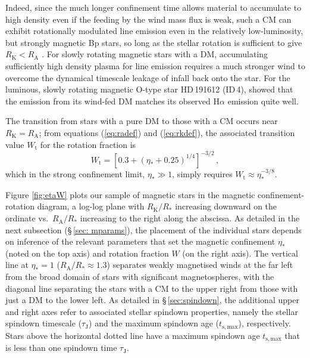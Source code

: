 \documentclass[useAMS,usenatbib]{mn2e}
\newcommand{\etas}{\eta_\ast}
\newcommand{\ra}{R_\mathrm{A}}
\newcommand{\rk}{R_\mathrm{K}}
\newcommand{\rs}{R_\ast}
\newcommand{\tauj}{\tau_\mathrm{J}}
\newcommand{\tsmax}{t_{\mathrm{s,max}}}
\begin{document}
 Indeed, since the much longer confinement time allows material to accumulate to high density even if the feeding by the wind mass flux is weak, such a CM can exhibit rotationally modulated line emission even in the relatively low-luminosity, but strongly magnetic Bp stars, so long as the stellar rotation is sufficient to give $ \rk < \ra$
\citep{2005MNRAS.357..251T,2005ApJ...630L..81T}.
For slowly rotating magnetic stars with a DM, accumulating sufficiently high density plasma for line emission requires a much stronger wind to overcome the dynamical timescale leakage of infall back onto the star. For the luminous, slowly rotating magnetic O-type star HD\,191612 (ID\,4), 
\cite{2012MNRAS.423L..21S} showed that the emission from its wind-fed DM matches its observed H$\alpha$ emission quite well.

 
 


The transition from stars with a pure DM to those with a CM occurs near $\rk = \ra$; 
from equations (\ref{eq:radef}) and (\ref{eq:rkdef}), the associated transition value $W_\mathrm{t}$ for the rotation fraction is
\begin{equation}
W_\mathrm{t} =  \left [  0.3 + \left ( \etas + 0.25 \right)^{1/4} \right]^{-3/2} 
\, ,
\end{equation}
which in the strong confinement limit, $\etas \gg 1$,  simply requires $W_\mathrm{t}  \approx \etas^{-3/8}$.

Figure \ref{fig:etaW} plots our sample of magnetic stars in the magnetic confinement-rotation diagram, a log-log plane with $\rk/\rs$ increasing downward on the ordinate vs.\ $\ra/\rs$ increasing to the right along the  abscissa.
As detailed in the next subsection (\S\,\ref{sec: mparams}),
the placement of the individual stars depends on inference of the relevant parameters that set the magnetic confinement $\etas$ (noted on the top axis) and rotation fraction $W$ (on the right axis).
The vertical line at $\etas = 1$ ($\ra/\rs \approx 1.3$) separates  weakly magnetised winds at the far left from the broad domain of stars with significant magnetospheres, with the diagonal line separating the stars with a CM to the upper right from those with just a DM to the lower left.
As detailed in \S\,\ref{sec:spindown},
the additional upper and right axes refer to associated stellar spindown properties, namely the stellar spindown timescale ($\tauj$) and the maximum spindown age ($\tsmax$), respectively.
Stars above the horizontal dotted line have a maximum spindown age $\tsmax$  that is less than one spindown time $\tauj$.
\end{document}

